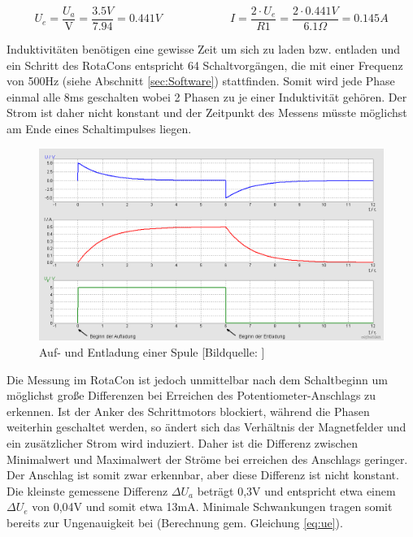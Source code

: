 \documentclass[11pt, titlepage]{report}
\begin{document}
				\begin{equation}
					\label{eq:ue}
					U_{e}=\frac{U_{a}}{\text{V}} = \frac{3.5V}{7.94} = 0.441V \hspace{6em} I=\frac{2\cdot U_{e}}{R1}=\frac{2\cdot 0.441V}{6.1\Omega}=0.145A
				\end{equation}

				Induktivitäten benötigen eine gewisse Zeit um sich zu laden bzw. entladen und ein Schritt des RotaCons entspricht 64 Schaltvorgängen, die mit einer Frequenz von 500Hz (siehe Abschnitt \ref{sec:Software}) stattfinden. Somit wird jede Phase einmal alle 8ms geschalten wobei 2 Phasen zu je einer Induktivität gehören. Der Strom ist daher nicht konstant und der Zeitpunkt des Messens müsste möglichst am Ende eines Schaltimpulses liegen.
				
				\vspace{1.5em}
				\begin{figure}[htbp]
					\label{fig:spule}
					\centering
					\includegraphics[width=0.7\linewidth]{img/Spule.png}
					\caption{Auf- und Entladung einer Spule [Bildquelle: \cite{Spule}]}
				\end{figure}	
				
				Die Messung im RotaCon ist jedoch unmittelbar nach dem Schaltbeginn um möglichst große Differenzen bei Erreichen des Potentiometer-Anschlags zu erkennen.
				\newline Ist der Anker des Schrittmotors blockiert, während die Phasen weiterhin geschaltet werden, so ändert sich das Verhältnis der Magnetfelder und ein zusätzlicher Strom wird induziert. Daher ist die Differenz zwischen Minimalwert und Maximalwert der Ströme bei erreichen des Anschlags geringer. Der Anschlag ist somit zwar erkennbar,
				aber diese Differenz ist nicht konstant. Die kleinste gemessene Differenz $\Delta U_{a}$ beträgt 0,3V und entspricht etwa einem $\Delta U_{e}$ von 0,04V und somit etwa 13mA. Minimale Schwankungen tragen somit bereits zur Ungenauigkeit bei (Berechnung gem. Gleichung \ref{eq:ue}).
			\newpage
\end{document}
